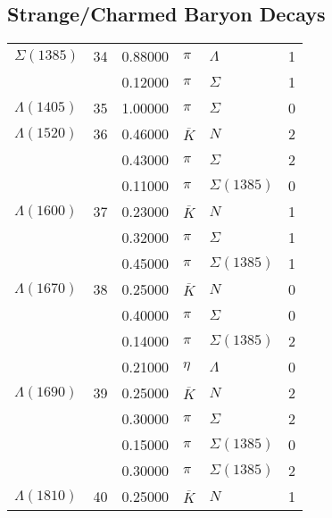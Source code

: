 \documentclass[a4paper,10pt]{article}
\begin{document}
\subsection{Strange/Charmed Baryon Decays}
\begin{tabular}[t]{|lr|l|ll|l|} 
\hline
$      \Sigma(1385)  $& 34& 0.88000&$ \pi                 $ &$ \Lambda             $& 1\\
$                    $&   & 0.12000&$ \pi                 $ &$ \Sigma              $& 1\\
\hline
$      \Lambda(1405) $& 35& 1.00000&$ \pi                 $ &$ \Sigma              $& 0\\
\hline
$      \Lambda(1520) $& 36& 0.46000&$ \overline{K}        $ &$ N                   $& 2\\
$                    $&   & 0.43000&$ \pi                 $ &$ \Sigma              $& 2\\
$                    $&   & 0.11000&$ \pi                 $ &$ \Sigma(1385)        $& 0\\
\hline
$      \Lambda(1600) $& 37& 0.23000&$ \overline{K}        $ &$ N                   $& 1\\
$                    $&   & 0.32000&$ \pi                 $ &$ \Sigma              $& 1\\
$                    $&   & 0.45000&$ \pi                 $ &$ \Sigma(1385)        $& 1\\
\hline
$      \Lambda(1670) $& 38& 0.25000&$ \overline{K}        $ &$ N                   $& 0\\
$                    $&   & 0.40000&$ \pi                 $ &$ \Sigma              $& 0\\
$                    $&   & 0.14000&$ \pi                 $ &$ \Sigma(1385)        $& 2\\
$                    $&   & 0.21000&$ \eta                $ &$ \Lambda             $& 0\\
\hline
$      \Lambda(1690) $& 39& 0.25000&$ \overline{K}        $ &$ N                   $& 2\\
$                    $&   & 0.30000&$ \pi                 $ &$ \Sigma              $& 2\\
$                    $&   & 0.15000&$ \pi                 $ &$ \Sigma(1385)        $& 0\\
$                    $&   & 0.30000&$ \pi                 $ &$ \Sigma(1385)        $& 2\\
\hline
$      \Lambda(1810) $& 40& 0.25000&$ \overline{K}        $ &$ N                   $& 1\\

\end{tabular}
\end{document}

